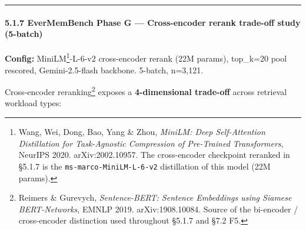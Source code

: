 \documentclass[
]{article}
\begin{document}
\begin{center}\rule{0.5\linewidth}{0.5pt}\end{center}

\paragraph{5.1.7 EverMemBench Phase G --- Cross-encoder rerank trade-off
study
(5-batch)}\label{evermembench-phase-g-cross-encoder-rerank-trade-off-study-5-batch}

\textbf{Config:} MiniLM\footnote{Wang, Wei, Dong, Bao, Yang \& Zhou,
  \emph{MiniLM: Deep Self-Attention Distillation for Task-Agnostic
  Compression of Pre-Trained Transformers}, NeurIPS 2020.
  arXiv:2002.10957. The cross-encoder checkpoint reranked in §5.1.7 is
  the \texttt{ms-marco-MiniLM-L-6-v2} distillation of this model (22M
  params).}-L-6-v2 cross-encoder rerank (22M params), top\_k=20 pool
rescored, Gemini-2.5-flash backbone. 5-batch, n=3,121.

Cross-encoder reranking\footnote{Reimers \& Gurevych,
  \emph{Sentence-BERT: Sentence Embeddings using Siamese BERT-Networks},
  EMNLP 2019. arXiv:1908.10084. Source of the bi-encoder / cross-encoder
  distinction used throughout §5.1.7 and §7.2 F5.} exposes a
\textbf{4-dimensional trade-off} across retrieval workload types:
\end{document}
